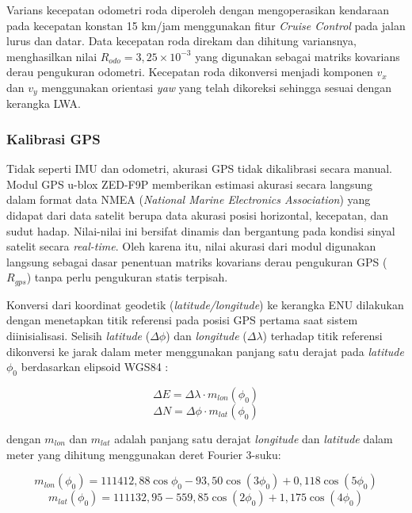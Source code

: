 Varians kecepatan odometri roda diperoleh dengan mengoperasikan kendaraan pada kecepatan konstan 15 km/jam menggunakan fitur \emph{Cruise Control} pada jalan lurus dan datar.
Data kecepatan roda direkam dan dihitung variansnya, menghasilkan nilai ${R}_{odo} = 3{,}25\times10^{-3}$ yang digunakan sebagai matriks kovarians derau pengukuran odometri. Kecepatan roda dikonversi menjadi komponen $v_x$ dan $v_y$ menggunakan orientasi \emph{yaw} yang telah dikoreksi sehingga sesuai dengan kerangka LWA.

\subsubsection{Kalibrasi GPS}

Tidak seperti IMU dan odometri, akurasi GPS tidak dikalibrasi secara manual.
Modul GPS u-blox ZED-F9P memberikan estimasi akurasi secara langsung dalam format data NMEA (\emph{National Marine Electronics Association}) yang didapat dari data satelit berupa data akurasi posisi horizontal, kecepatan, dan sudut hadap.
Nilai-nilai ini bersifat dinamis dan bergantung pada kondisi sinyal satelit secara \emph{real-time}.
Oleh karena itu, nilai akurasi dari modul digunakan langsung sebagai dasar penentuan matriks kovarians derau pengukuran GPS (${R}_{gps}$) tanpa perlu pengukuran statis terpisah.

Konversi dari koordinat geodetik (\emph{latitude/longitude}) ke kerangka ENU dilakukan dengan menetapkan titik referensi pada posisi GPS pertama saat sistem diinisialisasi. Selisih \emph{latitude} ($\Delta\phi$) dan \emph{longitude} ($\Delta\lambda$) terhadap titik referensi dikonversi ke jarak dalam meter menggunakan panjang satu derajat pada \emph{latitude} $\phi_0$ berdasarkan elipsoid WGS84 \parencite{NIMA2000WGS84}:

\begin{equation}
\Delta E = \Delta\lambda \cdot m_{lon}(\phi_0)
\end{equation}
\begin{equation}
\Delta N = \Delta\phi \cdot m_{lat}(\phi_0)
\end{equation}

dengan $m_{lon}$ dan $m_{lat}$ adalah panjang satu derajat \emph{longitude} dan \emph{latitude} dalam meter yang dihitung menggunakan deret Fourier 3-suku:

\begin{equation}
m_{lon}(\phi_0) = 111412{,}88 \cos\phi_0 - 93{,}50 \cos(3\phi_0) + 0{,}118 \cos(5\phi_0)
\end{equation}
\begin{equation}
m_{lat}(\phi_0) = 111132{,}95 - 559{,}85 \cos(2\phi_0) + 1{,}175 \cos(4\phi_0)
\end{equation}

